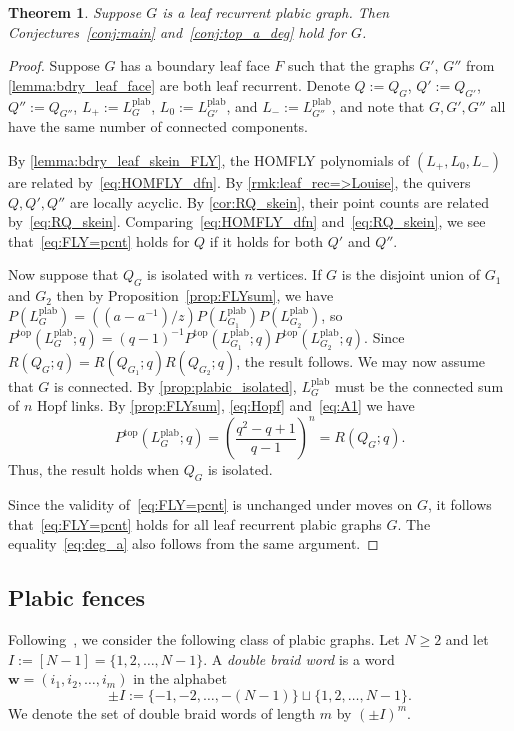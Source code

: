 \documentclass[11pt]{article}
\newtheorem{theorem}[theo]{Theorem}
\theoremstyle{definition}
\numberwithin{equation}{section}
\newcommand\bw{{\mathbf{w}}}
\newcommand\plab{\operatorname{plab}}
\newcommand\Lplab{L^{\plab}}
\newcommand\QG{Q_G}
\def\RQX#1#2{R(#1;#2)}
\def\RQG(#1){R(\QG;#1)}
\newcommand\HOMP{P}
\newcommand\Top{{\operatorname{top}}}
\def\Ptop_#1(#2){P^\Top(#1;#2)}
\def\QX(#1){Q_{#1}}
\newcommand\pmn{\pm I}
\newcommand\DRW{(\pmn)^m}
\newcommand\n{N}
\newcommand\Louise{locally acyclic\xspace}
\newcommand{\FLY}{HOMFLY\xspace}
\begin{document}
\begin{theorem}
  Suppose $G$ is a leaf recurrent plabic graph. Then Conjectures~\ref{conj:main} and~\ref{conj:top_a_deg} hold for $G$.
\end{theorem}
\begin{proof}
  Suppose $G$ has a boundary leaf face $F$ such that the graphs $G'$, $G''$ from \cref{lemma:bdry_leaf_face} are both leaf recurrent. Denote $Q:=\QG$, $Q':=\QX(G')$, $Q'':=\QX(G'')$, $L_+:=\Lplab_G$, $L_0:=\Lplab_{G'}$, and $L_-:=\Lplab_{G''}$, and note that $G,G',G''$ all have the same number of connected components.

By \cref{lemma:bdry_leaf_skein_FLY}, the \FLY polynomials of $(L_+,L_0,L_-)$ are related by~\eqref{eq:HOMFLY_dfn}. By \cref{rmk:leaf_rec=>Louise}, the quivers $Q,Q',Q''$ are \Louise. By \cref{cor:RQ_skein}, their point counts are related by~\eqref{eq:RQ_skein}. Comparing~\eqref{eq:HOMFLY_dfn} and~\eqref{eq:RQ_skein}, we see that~\eqref{eq:FLY=pcnt} holds for $Q$ if it holds for both $Q'$ and $Q''$.

Now suppose that $\QG$ is isolated with $n$ vertices.  If $G$ is the disjoint union of $G_1$ and $G_2$ then by Proposition~\ref{prop:FLYsum}, we have $\HOMP(\Lplab_{G})= ((a-a^{-1})/z)\HOMP(\Lplab_{G_1})\HOMP(\Lplab_{G_2})$, so $\Ptop_{\Lplab_G}(q) = (q-1)^{-1} \Ptop_{\Lplab_{G_1}}(q)\Ptop_{\Lplab_{G_2}}(q)$.  Since $\RQG(q) = \RQX{\QX(G_1)}{q}\RQX{\QX(G_2)}{q}$, the result follows. We may now assume that $G$ is connected.  By \cref{prop:plabic_isolated}, $\Lplab_G$ must be the connected sum of $n$ Hopf links.  By \cref{prop:FLYsum}, \eqref{eq:Hopf} and~\eqref{eq:A1} we have 
$$\Ptop_{\Lplab_G}(q) = \left(\frac{q^2-q+1}{q-1}\right)^n = \RQG(q).
$$
Thus, the result holds when $\QG$ is isolated.

Since the validity of~\eqref{eq:FLY=pcnt} is unchanged under moves on $G$, it follows that~\eqref{eq:FLY=pcnt} holds for all leaf recurrent plabic graphs $G$.  The equality~\eqref{eq:deg_a} also follows from the same argument.
\end{proof}

\subsection{Plabic fences}\label{sec:plabic-fences}
Following~\cite[Section~12]{FPST}, we consider the following class of plabic graphs. Let $\n\geq 2$ and let $I:=[\n-1]=\{1,2,\dots,\n-1\}$. A \emph{double braid word} is a word $\bw=(i_1,i_2,\dots,i_m)$ in the alphabet
\begin{equation*}%
  \pmn:=\{-1,-2,\dots,-(\n-1)\}\sqcup\{1,2,\dots,\n-1\}.
\end{equation*}
We denote the set of double braid words of length $m$ by $\DRW$. 
\end{document}
